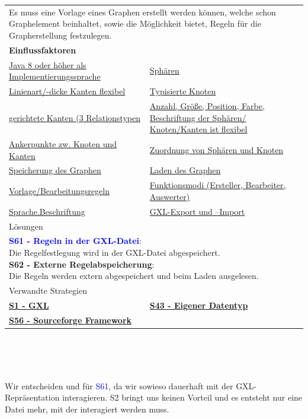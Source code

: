 \documentclass[enabledeprecatedfontcommands,fontsize=11pt,paper=a4,twoside]{scrartcl}
\newcounter{one}
\newcommand{\cb}[1]{{\textcolor{blue}{#1}}}
\begin{document}
\newpage
\begin{tabular} {|p{8cm} p{8cm}|}
	\hline
	\rowcolor{prob}\multicolumn{2}{|l|}{\parbox{16cm}{\textbf{24: Vorlage}}} \\  \hline\hline 
	\multicolumn{2}{|l|}{\parbox{16cm}{Es muss eine Vorlage eines Graphen erstellt werden können, welche schon Graphelement beinhaltet, sowie die Möglichkeit bietet, Regeln für die Grapherstellung festzulegen.}}\rule{0pt}{4ex}\\ [1ex] \hline
	\multicolumn{2}{|l|}{\textbf{Einflussfaktoren}}\\
	\hyperlink{b}{Java 8 oder höher als Implementierungssprache}  & 
	\hyperlink {n}{Sphären} \\
	\hyperlink {o}{Linienart/-dicke Kanten flexibel}&
	\hyperlink {p}{Typisierte Knoten} \\
	\hyperlink {q}{gerichtete Kanten (3 Relationstypen} &
	\hyperlink {r}{Anzahl, Größe, Position, Farbe, Beschriftung der Sphären/ Knoten/Kanten ist flexibel} \\
	\hyperlink {s}{Ankerpunkte zw. Knoten und Kanten} &
	\hyperlink {t}{Zuordnung von Sphären und Knoten} \\
	\hyperlink {v}{Speicherung des Graphen} &
	\hyperlink {w}{Laden des Graphen} \\
	\hyperlink {y}{Vorlage/Bearbeitungsregeln} &
	\hyperlink {z}{Funktionsmodi (Ersteller, Bearbeiter, Auswerter)} \\
	\hyperlink {hh}{Sprache.Beschriftung} &
	\hyperlink {jj}{GXL-Export und –Import} 
	\\ \hline
	\multicolumn{2}{|l|}{Lösungen} \\
	\multicolumn{2}{|l|}{\parbox{16cm}{
			\textbf{\cb{\hypertarget{vvv}{S61 - Regeln in der GXL-Datei}}}: \\
			Die Regelfestlegung wird in der GXL-Datei abgespeichert. \\
			\textbf{S62 - Externe Regelabspeicherung}: \\
			Die Regeln werden extern abgespeichert und beim Laden ausgelesen. 
	} }\\ [6ex] \hline
	\multicolumn{2}{|l|}{Verwandte Strategien} \\
	\textbf{\hyperlink{yy}{S1 - GXL}}&
	\textbf{\hyperlink{ooo}{S43 - Eigener Datentyp}}\\
	\textbf{\hyperlink{ttt}{S56 - Sourceforge Framework}}&
	\\\hline
\end{tabular}\\ \\ \\
\begin{onehalfspace}
	Wir entscheiden und für \cb{S61}, da wir sowieso dauerhaft mit der GXL-Repräsentation interagieren. S2 bringt uns keinen Vorteil und es entsteht nur eine Datei mehr, mit der interagiert werden muss. 
\end{onehalfspace}
\end{document}
